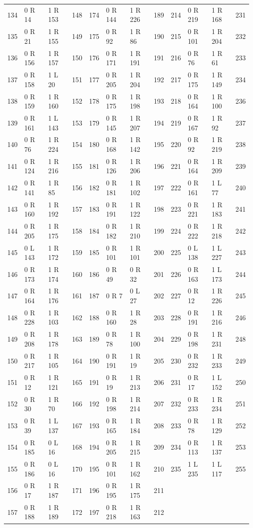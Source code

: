 \begin{center}
\begin{tabular}{@{}rllr@{\hspace{12pt}}rllr@{\hspace{12pt}}rllr@{}}
134 & 0 R 14 & 1 R 153 & 148 & 174 & 0 R 144 & 1 R 226 & 189 & 214 & 0 R 219 & 1 R 168 & 231\\
135 & 0 R 21 & 1 R 155 & 149 & 175 & 0 R 92 & 1 R 86 & 190 & 215 & 0 R 101 & 1 R 204 & 232\\
136 & 0 R 156 & 1 R 157 & 150 & 176 & 0 R 171 & 1 R 191 & 191 & 216 & 0 R 76 & 1 R 61 & 233\\
137 & 0 R 158 & 1 L 20 & 151 & 177 & 0 R 205 & 1 R 204 & 192 & 217 & 0 R 175 & 1 R 149 & 234\\
138 & 0 R 159 & 1 R 160 & 152 & 178 & 0 R 175 & 1 R 198 & 193 & 218 & 0 R 164 & 1 R 100 & 236\\
139 & 0 R 161 & 1 L 143 & 153 & 179 & 0 R 145 & 1 R 207 & 194 & 219 & 0 R 167 & 1 R 92 & 237\\
140 & 0 R 76 & 1 R 224 & 154 & 180 & 0 R 168 & 1 R 142 & 195 & 220 & 0 R 92 & 1 R 219 & 238\\
141 & 0 R 124 & 1 R 216 & 155 & 181 & 0 R 126 & 1 R 206 & 196 & 221 & 0 R 164 & 1 R 209 & 239\\
142 & 0 R 141 & 1 R 85 & 156 & 182 & 0 R 181 & 1 R 102 & 197 & 222 & 0 R 161 & 1 L 77 & 240\\
143 & 0 R 160 & 1 R 192 & 157 & 183 & 0 R 191 & 1 R 122 & 198 & 223 & 0 R 221 & 1 R 183 & 241\\
144 & 0 R 205 & 1 R 175 & 158 & 184 & 0 R 182 & 1 R 210 & 199 & 224 & 0 R 222 & 1 R 218 & 242\\
145 & 0 L 143 & 1 R 172 & 159 & 185 & 0 R 101 & 1 R 101 & 200 & 225 & 0 L 138 & 1 L 227 & 243\\
146 & 0 R 173 & 1 R 174 & 160 & 186 & 0 R 49 & 0 R 32 & 201 & 226 & 0 R 163 & 1 L 173 & 244\\
147 & 0 R 164 & 1 R 176 & 161 & 187 & 0 R 7 & 0 L 27 & 202 & 227 & 0 R 12 & 1 R 226 & 245\\
148 & 0 R 228 & 1 R 103 & 162 & 188 & 0 R 160 & 1 R 28 & 203 & 228 & 0 R 191 & 1 R 216 & 246\\
149 & 0 R 208 & 1 R 178 & 163 & 189 & 0 R 78 & 1 R 100 & 204 & 229 & 0 R 198 & 1 R 231 & 248\\
150 & 0 R 217 & 1 R 105 & 164 & 190 & 0 R 191 & 1 R 19 & 205 & 230 & 0 R 232 & 1 R 233 & 249\\
151 & 0 R 12 & 1 R 121 & 165 & 191 & 0 R 19 & 1 R 213 & 206 & 231 & 0 R 17 & 1 L 152 & 250\\
152 & 0 R 30 & 1 R 70 & 166 & 192 & 0 R 198 & 1 R 214 & 207 & 232 & 0 R 233 & 1 R 234 & 251\\
153 & 0 R 39 & 1 L 137 & 167 & 193 & 0 R 165 & 1 R 184 & 208 & 233 & 0 R 78 & 1 R 129 & 252\\
154 & 0 R 185 & 0 L 16 & 168 & 194 & 0 R 205 & 1 R 215 & 209 & 234 & 0 R 113 & 1 R 137 & 253\\
155 & 0 R 186 & 0 L 16 & 170 & 195 & 0 R 101 & 1 R 162 & 210 & 235 & 1 L 235 & 1 L 117 & 255\\
156 & 0 R 17 & 1 R 187 & 171 & 196 & 0 R 195 & 1 R 175 & 211 &  &  &  & \\
157 & 0 R 188 & 1 R 189 & 172 & 197 & 0 R 218 & 1 R 163 & 212 &  &  &  & \\
\bottomrule
\end{tabular}
\end{center}
\endgroup
